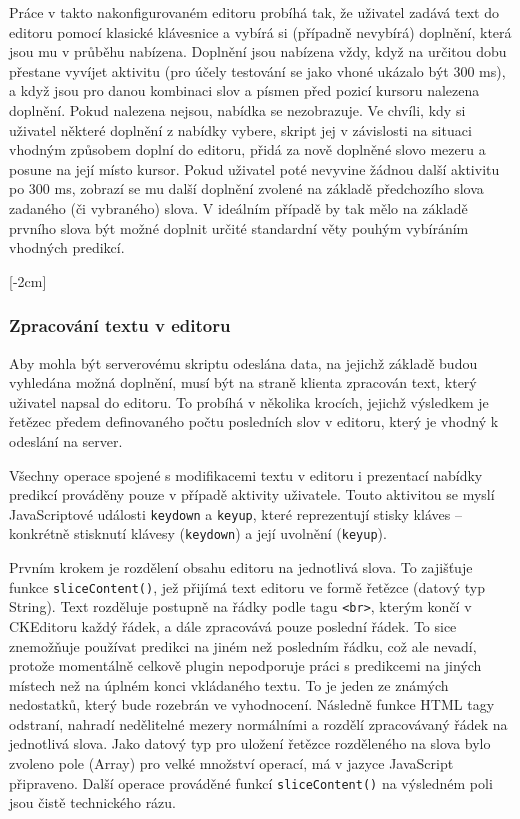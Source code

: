 \documentclass{article}
\begin{document}

Práce v takto nakonfigurovaném editoru probíhá tak, že uživatel zadává text do editoru pomocí klasické klávesnice a vybírá si (případně nevybírá) doplnění, která jsou mu v průběhu nabízena. Doplnění jsou nabízena vždy, když na určitou dobu přestane vyvíjet aktivitu (pro účely testování se jako vhoné ukázalo být 300 ms), a když jsou pro danou kombinaci slov a písmen před pozicí kursoru nalezena doplnění. Pokud nalezena nejsou, nabídka se nezobrazuje. Ve chvíli, kdy si uživatel některé doplnění z nabídky vybere, skript jej v závislosti na situaci vhodným způsobem doplní do editoru, přidá za nově doplněné slovo mezeru a posune na její místo kursor. Pokud uživatel poté nevyvine žádnou další aktivitu po 300 ms, zobrazí se mu další doplnění zvolené na základě předchozího slova zadaného (či vybraného) slova. V ideálním případě by tak mělo na základě prvního slova být možné doplnit určité standardní věty pouhým vybíráním vhodných predikcí. 

[-2cm]

\subsubsection{Zpracování textu v editoru}

Aby mohla být serverovému skriptu odeslána data, na jejichž základě budou vyhledána možná doplnění, musí být na straně klienta zpracován text, který uživatel napsal do editoru. To probíhá v několika krocích, jejichž výsledkem je řetězec předem definovaného počtu posledních slov v editoru, který je vhodný k odeslání na server.


Všechny operace spojené s modifikacemi textu v editoru i prezentací nabídky predikcí prováděny pouze v případě aktivity uživatele. Touto aktivitou se myslí JavaScriptové události {\tt keydown} a {\tt keyup}, které reprezentují stisky kláves -- konkrétně stisknutí klávesy ({\tt keydown}) a její uvolnění ({\tt keyup}).

Prvním krokem je rozdělení obsahu editoru na jednotlivá slova. To zajišťuje funkce {\tt sliceContent()}, jež přijímá text editoru ve formě řetězce (datový typ String). Text rozděluje postupně na řádky podle tagu {\tt <br>}, kterým končí v CKEditoru každý řádek, a dále zpracovává pouze poslední řádek. To sice znemožňuje používat predikci na jiném než posledním řádku, což ale nevadí, protože momentálně celkově plugin nepodporuje práci s predikcemi na jiných místech než na úplném konci vkládaného textu. To je jeden ze známých nedostatků, který bude rozebrán ve vyhodnocení. Následně funkce HTML tagy odstraní, nahradí nedělitelné mezery normálními a rozdělí zpracovávaný řádek na jednotlivá slova. Jako datový typ pro uložení řetězce rozděleného na slova bylo zvoleno pole (Array) pro velké množství operací, má v jazyce JavaScript připraveno. Další operace prováděné funkcí {\tt sliceContent()} na výsledném poli jsou čistě technického rázu. 
\end{document}
